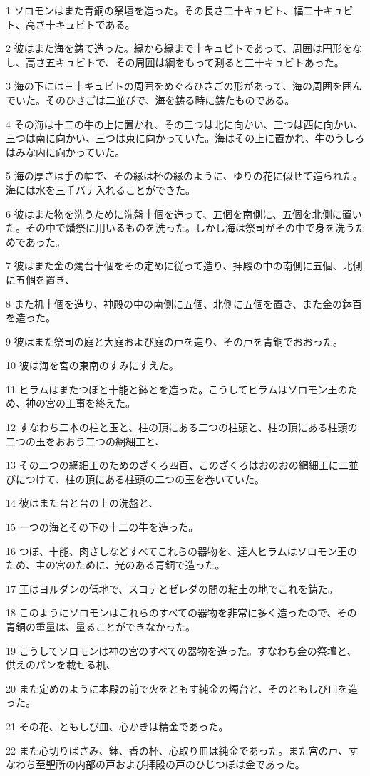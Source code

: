 \par 1 ソロモンはまた青銅の祭壇を造った。その長さ二十キュビト、幅二十キュビト、高さ十キュビトである。
\par 2 彼はまた海を鋳て造った。縁から縁まで十キュビトであって、周囲は円形をなし、高さ五キュビトで、その周囲は綱をもって測ると三十キュビトあった。
\par 3 海の下には三十キュビトの周囲をめぐるひさごの形があって、海の周囲を囲んでいた。そのひさごは二並びで、海を鋳る時に鋳たものである。
\par 4 その海は十二の牛の上に置かれ、その三つは北に向かい、三つは西に向かい、三つは南に向かい、三つは東に向かっていた。海はその上に置かれ、牛のうしろはみな内に向かっていた。
\par 5 海の厚さは手の幅で、その縁は杯の縁のように、ゆりの花に似せて造られた。海には水を三千バテ入れることができた。
\par 6 彼はまた物を洗うために洗盤十個を造って、五個を南側に、五個を北側に置いた。その中で燔祭に用いるものを洗った。しかし海は祭司がその中で身を洗うためであった。
\par 7 彼はまた金の燭台十個をその定めに従って造り、拝殿の中の南側に五個、北側に五個を置き、
\par 8 また机十個を造り、神殿の中の南側に五個、北側に五個を置き、また金の鉢百を造った。
\par 9 彼はまた祭司の庭と大庭および庭の戸を造り、その戸を青銅でおおった。
\par 10 彼は海を宮の東南のすみにすえた。
\par 11 ヒラムはまたつぼと十能と鉢とを造った。こうしてヒラムはソロモン王のため、神の宮の工事を終えた。
\par 12 すなわち二本の柱と玉と、柱の頂にある二つの柱頭と、柱の頂にある柱頭の二つの玉をおおう二つの網細工と、
\par 13 その二つの網細工のためのざくろ四百、このざくろはおのおの網細工に二並びにつけて、柱の頂にある柱頭の二つの玉を巻いていた。
\par 14 彼はまた台と台の上の洗盤と、
\par 15 一つの海とその下の十二の牛を造った。
\par 16 つぼ、十能、肉さしなどすべてこれらの器物を、達人ヒラムはソロモン王のため、主の宮のために、光のある青銅で造った。
\par 17 王はヨルダンの低地で、スコテとゼレダの間の粘土の地でこれを鋳た。
\par 18 このようにソロモンはこれらのすべての器物を非常に多く造ったので、その青銅の重量は、量ることができなかった。
\par 19 こうしてソロモンは神の宮のすべての器物を造った。すなわち金の祭壇と、供えのパンを載せる机、
\par 20 また定めのように本殿の前で火をともす純金の燭台と、そのともしび皿を造った。
\par 21 その花、ともしび皿、心かきは精金であった。
\par 22 また心切りばさみ、鉢、香の杯、心取り皿は純金であった。また宮の戸、すなわち至聖所の内部の戸および拝殿の戸のひじつぼは金であった。

